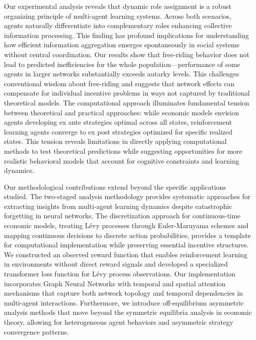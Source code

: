 Our experimental analysis reveals that dynamic role assignment is a robust organizing principle of multi-agent learning systems. Across both scenarios, agents naturally differentiate into complementary roles enhancing collective information processing. This finding has profound implications for understanding how efficient information aggregation emerges spontaneously in social systems without central coordination.
Our results show that free-riding behavior does not lead to predicted inefficiencies for the whole population—performance of some agents in larger networks substantially exceeds autarky levels. This challenges conventional wisdom about free-riding and suggests that network effects can compensate for individual incentive problems in ways not captured by traditional theoretical models.
The computational approach illuminates fundamental tension between theoretical and practical approaches: while economic models envision agents developing ex ante strategies optimal across all states, reinforcement learning agents converge to ex post strategies optimized for specific realized states. This tension reveals limitations in directly applying computational methods to test theoretical predictions while suggesting opportunities for more realistic behavioral models that account for cognitive constraints and learning dynamics.

Our methodological contributions extend beyond the specific applications studied. The two-staged analysis methodology provides systematic approaches for extracting insights from multi-agent learning dynamics despite catastrophic forgetting in neural networks. The discretization approach for continuous-time economic models, treating Lévy processes through Euler-Maruyama schemes and mapping continuous decisions to discrete action probabilities, provides a template for computational implementation while preserving essential incentive structures. We constructed an observed reward function that enables reinforcement learning in environments without direct reward signals and developed a specialized transformer loss function for Lévy process observations. Our implementation incorporates Graph Neural Networks with temporal and spatial attention mechanisms that capture both network topology and temporal dependencies in multi-agent interactions. Furthermore, we introduce off-equilibrium asymmetric analysis methods that move beyond the symmetric equilibria analysis in economic theory, allowing for heterogeneous agent behaviors and asymmetric strategy convergence patterns.

